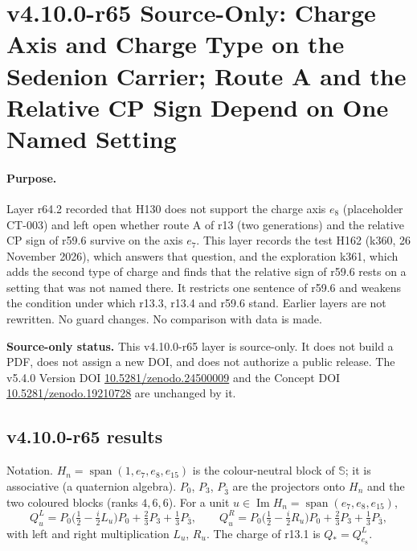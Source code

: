 
\clearpage
\section*{v4.10.0-r65 Source-Only: Charge Axis and Charge Type on the Sedenion Carrier; Route A and the Relative CP Sign Depend on One Named Setting}
\label{sec:v4100-r65-charge-axis-type}

\paragraph{Purpose.}
Layer r64.2 recorded that H130 does not support the charge axis \(e_8\) (placeholder CT-003) and left open whether route A of r13 (two generations)
and the relative CP sign of r59.6 survive on the axis \(e_7\).  This layer records the test H162 (k360, 26 November 2026), which answers that
question, and the exploration k361, which adds the second type of charge and finds that the relative sign of r59.6 rests on a setting that was
not named there.  It restricts one sentence of r59.6 and weakens the condition under which r13.3, r13.4 and r59.6 stand.  Earlier layers are not
rewritten.  No guard changes.  No comparison with data is made.

\noindent\textbf{Source-only status.}
This v4.10.0-r65 layer is source-only.  It does not build a PDF, does not assign a new DOI,
and does not authorize a public release.  The v5.4.0 Version DOI
\href{https://doi.org/10.5281/zenodo.24500009}{10.5281/zenodo.24500009} and the Concept DOI
\href{https://doi.org/10.5281/zenodo.19210728}{10.5281/zenodo.19210728} are unchanged by it.

\subsection*{v4.10.0-r65 results}
\label{subsec:v4100-r65-results}

Notation.  \(H_n=\operatorname{span}(1,e_7,e_8,e_{15})\) is the colour-neutral block of \(\mathbb S\); it is associative (a quaternion algebra).
\(P_0\), \(P_3\), \(P_{\bar3}\) are the projectors onto \(H_n\) and the two coloured blocks (ranks \(4,6,6\)).  For a unit
\(u\in\operatorname{Im}H_n=\operatorname{span}(e_7,e_8,e_{15})\),
\[
Q^{L}_u=P_0\bigl(\tfrac12-\tfrac i2L_u\bigr)P_0+\tfrac23P_3+\tfrac13P_{\bar3},
\qquad
Q^{R}_u=P_0\bigl(\tfrac12-\tfrac i2R_u\bigr)P_0+\tfrac23P_3+\tfrac13P_{\bar3},
\]
with left and right multiplication \(L_u\), \(R_u\).  The charge of r13.1 is \(Q_*=Q^L_{e_8}\).


